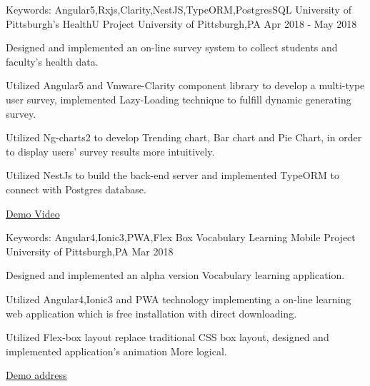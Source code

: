 \begin{cventries}
    
      \cventry
    {Keywords: Angular5,Rxjs,Clarity,NestJS,TypeORM,PostgresSQL} %
    {University of Pittsburgh's HealthU Project} %
    {University of Pittsburgh,PA} %
    {Apr 2018 - May 2018}  %
    {
      \begin{cvitems}
      	\item {Designed and implemented an on-line survey system to collect students and faculty's health data.}
		\item {Utilized Angular5 and Vmware-Clarity component library to develop a multi-type user survey, implemented Lazy-Loading technique to fulfill dynamic generating survey.}
        \item {Utilized Ng-charts2 to develop Trending chart, Bar chart and Pie Chart, in order to display users' survey results more intuitively.}
        \item{Utilized NestJs to build the back-end server and implemented TypeORM to connect with Postgres database.}
        \item {\href{https://www.youtube.com/watch?v=BudcaOVT4Yc}{Demo Video}}
      \end{cvitems}
    }
    
     \cventry
    {Keywords: Angular4,Ionic3,PWA,Flex Box} %
    {Vocabulary Learning Mobile Project} %
    {University of Pittsburgh,PA} %
    {Mar 2018}  %
    {
      \begin{cvitems}
      	\item {Designed and implemented an alpha version Vocabulary learning application.}
		\item {Utilized Angular4,Ionic3 and PWA technology implementing a on-line learning web application which is free installation with direct downloading.}
        \item {Utilized Flex-box layout replace traditional CSS box layout, designed and implemented application's animation More logical.}
        \item {\href{https://fathomless-thicket-29720.herokuapp.com}{Demo address}}
      \end{cvitems}
    }
    

\end{cventries}
